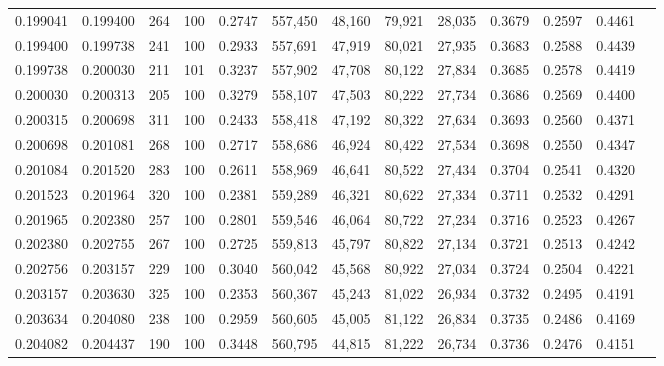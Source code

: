 \begin{tabular}{rrrrrrrrrrrrr}
0.199041 & 0.199400 &   264 & 100 &                                     0.2747 & 557,450 &  48,160 &  79,921 &  28,035 & 0.3679 & 0.2597 & 0.4461 \\
0.199400 & 0.199738 &   241 & 100 &                                     0.2933 & 557,691 &  47,919 &  80,021 &  27,935 & 0.3683 & 0.2588 & 0.4439 \\
0.199738 & 0.200030 &   211 & 101 &                                     0.3237 & 557,902 &  47,708 &  80,122 &  27,834 & 0.3685 & 0.2578 & 0.4419 \\
0.200030 & 0.200313 &   205 & 100 &                                     0.3279 & 558,107 &  47,503 &  80,222 &  27,734 & 0.3686 & 0.2569 & 0.4400 \\
0.200315 & 0.200698 &   311 & 100 &                                     0.2433 & 558,418 &  47,192 &  80,322 &  27,634 & 0.3693 & 0.2560 & 0.4371 \\
0.200698 & 0.201081 &   268 & 100 &                                     0.2717 & 558,686 &  46,924 &  80,422 &  27,534 & 0.3698 & 0.2550 & 0.4347 \\
0.201084 & 0.201520 &   283 & 100 &                                     0.2611 & 558,969 &  46,641 &  80,522 &  27,434 & 0.3704 & 0.2541 & 0.4320 \\
0.201523 & 0.201964 &   320 & 100 &                                     0.2381 & 559,289 &  46,321 &  80,622 &  27,334 & 0.3711 & 0.2532 & 0.4291 \\
0.201965 & 0.202380 &   257 & 100 &                                     0.2801 & 559,546 &  46,064 &  80,722 &  27,234 & 0.3716 & 0.2523 & 0.4267 \\
0.202380 & 0.202755 &   267 & 100 &                                     0.2725 & 559,813 &  45,797 &  80,822 &  27,134 & 0.3721 & 0.2513 & 0.4242 \\
0.202756 & 0.203157 &   229 & 100 &                                     0.3040 & 560,042 &  45,568 &  80,922 &  27,034 & 0.3724 & 0.2504 & 0.4221 \\
0.203157 & 0.203630 &   325 & 100 &                                     0.2353 & 560,367 &  45,243 &  81,022 &  26,934 & 0.3732 & 0.2495 & 0.4191 \\
0.203634 & 0.204080 &   238 & 100 &                                     0.2959 & 560,605 &  45,005 &  81,122 &  26,834 & 0.3735 & 0.2486 & 0.4169 \\
0.204082 & 0.204437 &   190 & 100 &                                     0.3448 & 560,795 &  44,815 &  81,222 &  26,734 & 0.3736 & 0.2476 & 0.4151 \\

\end{tabular}
